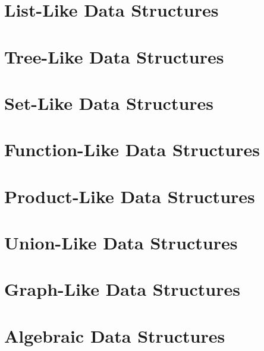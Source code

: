 \documentclass{book}
\begin{document}
\chapter{List-Like Data Structures}

\chapter{Tree-Like Data Structures}


\chapter{Set-Like Data Structures}

\chapter{Function-Like Data Structures}

\chapter{Product-Like Data Structures}

\chapter{Union-Like Data Structures}

\chapter{Graph-Like Data Structures} %

\chapter{Algebraic Data Structures}
\end{document}
